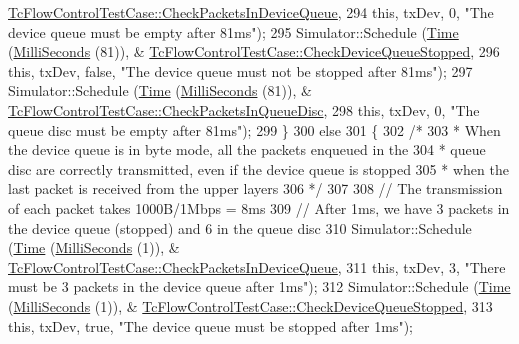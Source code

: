 \begin{DoxyCode}
      \hyperlink{classTcFlowControlTestCase_a7ad467b39fdb155daea4b048619f6d12}{TcFlowControlTestCase::CheckPacketsInDeviceQueue},
294                           \textcolor{keyword}{this}, txDev, 0, \textcolor{stringliteral}{"The device queue must be empty after 81ms"});
295       Simulator::Schedule (\hyperlink{classns3_1_1Time}{Time} (\hyperlink{group__timecivil_gaf26127cf4571146b83a92ee18679c7a9}{MilliSeconds} (81)), &
      \hyperlink{classTcFlowControlTestCase_a4ccc9564c9142984fa8041f67b4a518a}{TcFlowControlTestCase::CheckDeviceQueueStopped},
296                           \textcolor{keyword}{this}, txDev, \textcolor{keyword}{false}, \textcolor{stringliteral}{"The device queue must not be stopped after 81ms"});
297       Simulator::Schedule (\hyperlink{classns3_1_1Time}{Time} (\hyperlink{group__timecivil_gaf26127cf4571146b83a92ee18679c7a9}{MilliSeconds} (81)), &
      \hyperlink{classTcFlowControlTestCase_ac6d0b6a74dd29a21369bf1d26795098d}{TcFlowControlTestCase::CheckPacketsInQueueDisc},
298                           \textcolor{keyword}{this}, txDev, 0, \textcolor{stringliteral}{"The queue disc must be empty after 81ms"});
299     \}
300   \textcolor{keywordflow}{else}
301     \{
302       \textcolor{comment}{/*}
303 \textcolor{comment}{       * When the device queue is in byte mode, all the packets enqueued in the}
304 \textcolor{comment}{       * queue disc are correctly transmitted, even if the device queue is stopped}
305 \textcolor{comment}{       * when the last packet is received from the upper layers}
306 \textcolor{comment}{       */}
307 
308       \textcolor{comment}{// The transmission of each packet takes 1000B/1Mbps = 8ms}
309       \textcolor{comment}{// After 1ms, we have 3 packets in the device queue (stopped) and 6 in the queue disc}
310       Simulator::Schedule (\hyperlink{classns3_1_1Time}{Time} (\hyperlink{group__timecivil_gaf26127cf4571146b83a92ee18679c7a9}{MilliSeconds} (1)), &
      \hyperlink{classTcFlowControlTestCase_a7ad467b39fdb155daea4b048619f6d12}{TcFlowControlTestCase::CheckPacketsInDeviceQueue},
311                           \textcolor{keyword}{this}, txDev, 3, \textcolor{stringliteral}{"There must be 3 packets in the device queue after 1ms"});
312       Simulator::Schedule (\hyperlink{classns3_1_1Time}{Time} (\hyperlink{group__timecivil_gaf26127cf4571146b83a92ee18679c7a9}{MilliSeconds} (1)), &
      \hyperlink{classTcFlowControlTestCase_a4ccc9564c9142984fa8041f67b4a518a}{TcFlowControlTestCase::CheckDeviceQueueStopped},
313                           \textcolor{keyword}{this}, txDev, \textcolor{keyword}{true}, \textcolor{stringliteral}{"The device queue must be stopped after 1ms"});

\end{DoxyCode}
